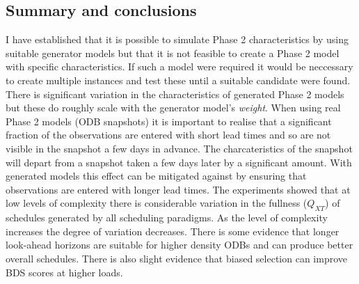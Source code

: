 \subsection{Summary and conclusions}

I have established that it is possible to simulate Phase 2 characteristics by using suitable generator models but that it is not feasible to create a Phase 2 model with specific characteristics. If such a model were required it would be neccessary to create multiple instances and test these until a suitable candidate were found. There is significant variation in the characteristics of generated  Phase 2 models but these do roughly scale with the generator model's \emph{weight}. When using real Phase 2 models (ODB snapshots) it is important to realise that a significant fraction of the observations are entered with short lead times and so are not visible in the snapshot a few days in advance. The charcateristics of the snapshot will depart from a snapshot taken a few days later by a significant amount. With generated models this effect can be mitigated against by ensuring that observations are entered with longer lead times. The experiments showed that at low levels of complexity there is considerable variation in the fullness ($Q_{XT}$) of schedules generated by all scheduling paradigms. As the level of complexity increases the degree of variation decreases. There is some evidence that longer look-ahead horizons are suitable for higher density ODBs and can produce better overall schedules. There is also slight evidence that biased selection can improve BDS scores at higher loads.

